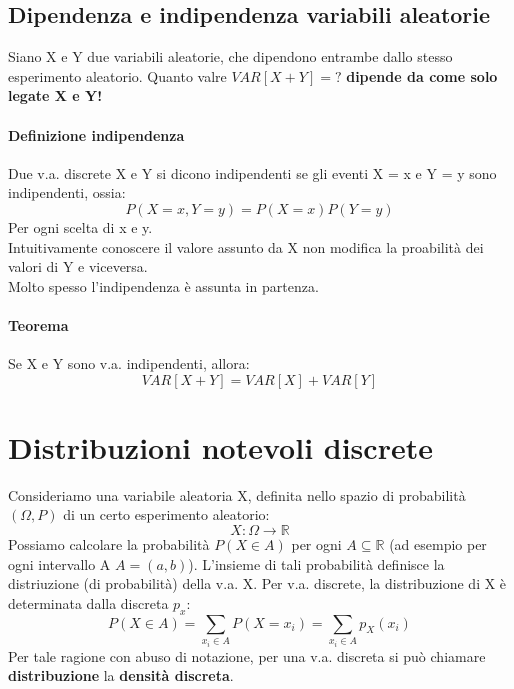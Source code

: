 \documentclass[12pt, a4paper, openany]{book}
\begin{document}
\subsection{Dipendenza e indipendenza variabili aleatorie}
Siano X e Y due variabili aleatorie, che dipendono entrambe dallo 
stesso esperimento aleatorio. Quanto valre $VAR[X+Y] = ?$
\textbf{dipende da come solo legate X e Y!}
\paragraph{Definizione indipendenza} Due v.a. discrete X e Y si dicono indipendenti
se gli eventi {X = x} e {Y = y} sono indipendenti, ossia:
\begin{equation*}
    P(X=x, Y=y) = P(X = x)P(Y = y)
\end{equation*}
Per ogni scelta di x e y.
\\ Intuitivamente conoscere il valore assunto da X non modifica la proabilità dei valori
di Y e viceversa.
\\ Molto spesso l'indipendenza è assunta in partenza.

\paragraph{Teorema} Se X e Y sono v.a. indipendenti, allora:
\begin{equation*}
    VAR[X+Y] = VAR[X] + VAR[Y]
\end{equation*}

\section{Distribuzioni notevoli discrete}
Consideriamo una variabile aleatoria X, definita nello spazio di probabilità
$(\Omega, P)$ di un certo esperimento aleatorio:
\begin{equation*}
    X:\Omega \rightarrow \mathbb{R} 
\end{equation*}
Possiamo calcolare la probabilità $P(X \in A)$ per ogni $A \subseteq \mathbb{R}$
(ad esempio per ogni intervallo A $A=(a,b)$).
L'insieme di tali probabilità definisce la distriuzione (di probabilità) della v.a. X.
Per v.a. discrete, la distribuzione di X è determinata dalla discreta $p_x$:
\begin{equation*}
    P(X \in A) = \sum_{x_i \in A} P(X=x_i) = \sum_{x_i \in A} p_X(x_i)  
\end{equation*}
Per tale ragione con abuso di notazione, per una v.a. discreta si può chiamare
\textbf{distribuzione} la \textbf{densità discreta}.
\end{document}
